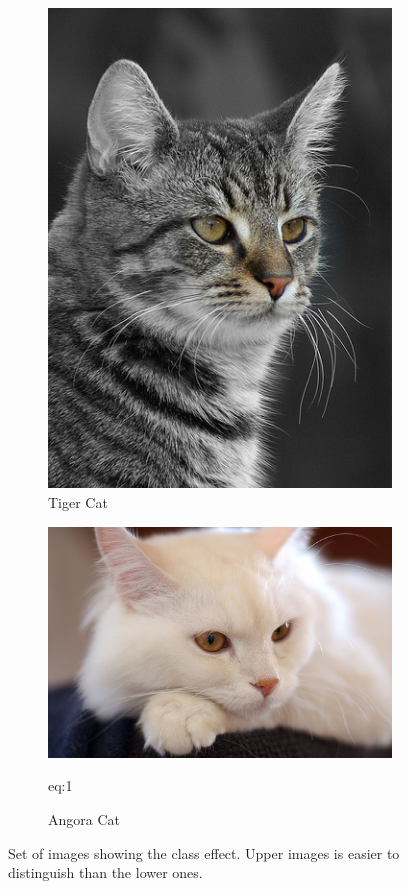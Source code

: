\documentclass[pageno]{jpaper}
\begin{document}
\begin{figure}
\begin{subfigure}{.2\textwidth}
  \includegraphics[scale=0.15]{classTypeExample7.jpg}
  \caption{Tiger Cat}
\end{subfigure}
\begin{subfigure}{.2\textwidth}
  \centering
  \includegraphics[scale=0.1]{classTypeExample8.jpg}
  \caption{Angora Cat}eq:1
\end{subfigure}

\caption{Set of images showing the class effect. Upper images is easier to distinguish than the lower ones.}
\label{fig:classEffect}
\end{figure}
\end{document}
